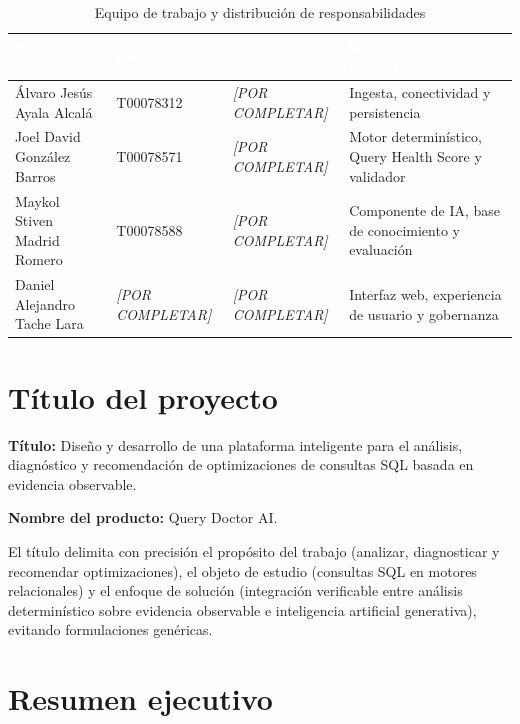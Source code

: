 \documentclass[12pt,a4paper]{article}
\begin{document}
\begingroup
{}
\begin{table}[H]
\centering
\small
\begin{tabularx}{\textwidth}{p{} p{} p{} X}
\toprule
\rowcolor{utbblue}
\textcolor{white}{\textbf{Nombre completo}} & \textcolor{white}{\textbf{Código}} & \textcolor{white}{\textbf{Correo}} & \textcolor{white}{\textbf{Responsabilidad técnica}} \\
\midrule
Álvaro Jesús Ayala Alcalá & T00078312 & \textit{[POR COMPLETAR]} & Ingesta, conectividad y persistencia \\
Joel David González Barros & T00078571 & \textit{[POR COMPLETAR]} & Motor determinístico, Query Health Score y validador \\
Maykol Stiven Madrid Romero & T00078588 & \textit{[POR COMPLETAR]} & Componente de IA, base de conocimiento y evaluación \\
Daniel Alejandro Tache Lara & \textit{[POR COMPLETAR]} & \textit{[POR COMPLETAR]} & Interfaz web, experiencia de usuario y gobernanza \\
\bottomrule
\end{tabularx}
\caption{Equipo de trabajo y distribución de responsabilidades}
\label{tab:equipo}
\end{table}
\endgroup

\section{Título del proyecto}

\textbf{Título:} Diseño y desarrollo de una plataforma inteligente para el análisis, diagnóstico y recomendación de optimizaciones de consultas SQL basada en evidencia observable.

\textbf{Nombre del producto:} Query Doctor AI.

El título delimita con precisión el propósito del trabajo (analizar, diagnosticar y recomendar optimizaciones), el objeto de estudio (consultas SQL en motores relacionales) y el enfoque de solución (integración verificable entre análisis determinístico sobre evidencia observable e inteligencia artificial generativa), evitando formulaciones genéricas.

\section{Resumen ejecutivo}
\end{document}
